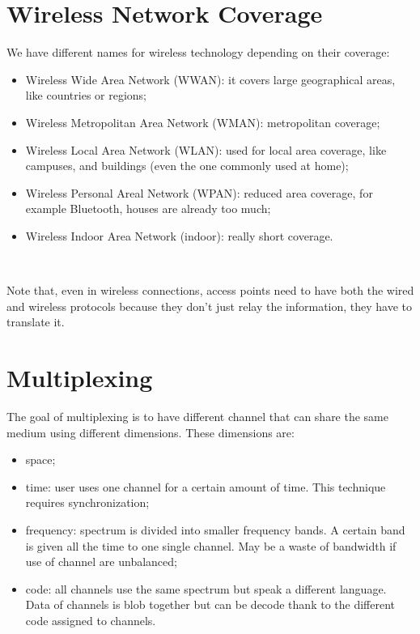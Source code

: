 \section{Wireless Network Coverage}
We have different names for wireless technology depending on their 
coverage:
\begin{itemize}
\item Wireless Wide Area Network (WWAN): it covers large 
  geographical areas, like countries or regions;
\item Wireless Metropolitan Area Network (WMAN): metropolitan 
  coverage;
\item Wireless Local Area Network (WLAN): used for local area 
  coverage, like campuses,  and buildings (even the one commonly used at home);
\item Wireless Personal Areal Network (WPAN): reduced area 
  coverage, for example Bluetooth, houses are already too much;
\item Wireless Indoor Area Network (indoor): really short 
  coverage.
\end{itemize}\

Note that, even in wireless connections, access points need to have both 
the wired and wireless protocols because they don't just relay the information, 
they have to translate it.

\section{Multiplexing}
The goal of multiplexing is to have different channel that can share the same medium using different dimensions. These dimensions are:
\begin{itemize}
\item space;
\item time: user uses one channel for a certain amount of time. This technique requires synchronization;
\item frequency: spectrum is divided into smaller frequency bands. A certain band is given all the time to one single channel. May be a waste of bandwidth if use of channel are unbalanced;
\item code: all channels use the same spectrum but speak a different language. Data of channels is blob together but can be decode thank to the different code assigned to channels.
\end{itemize}

